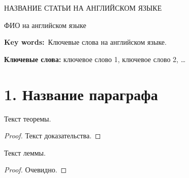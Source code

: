 
 \bigskip


 \begin{center}
 НАЗВАНИЕ СТАТЬИ НА АНГЛИЙСКОМ ЯЗЫКЕ
 \end{center}
 \begin{center}
  ФИО на английском языке
 \end{center}


\vspace*{-4pt}

{\noindent\footnotesize {\bf Key
 words:}~Ключевые слова на английском языке.\par}










{\noindent\footnotesize{\bf Ключевые
 слова:} ключевое слово 1, ключевое слово 2, \ldots\par}



\section*{1. Название параграфа}


\begin{aTeorema}
	\label{thm1}
	Текст теоремы.
\end{aTeorema}

\begin{proof}
	Текст доказательства.
\end{proof}

\begin{aLema}
	\label{lem2}
	Текст леммы.
\end{aLema}

\begin{proof}
	Очевидно.
\end{proof}

